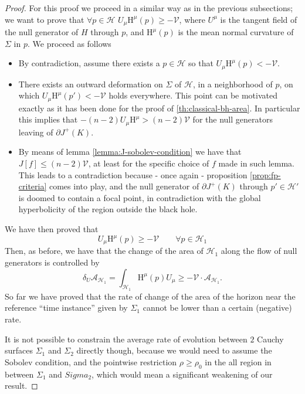 \begin{proof}
	For this proof we proceed in a similar way as in the previous subsections; we want to prove that \(\forall p \in \mathscr{H}\) \(U_{\mu}\mathrm{H}^{\mu}(p) \ge -\mathcal{V}\), where \(U^{\mu}\) is the tangent field of the null generator of \(H\) through \(p\), and \(\mathrm{H}^{\mu}(p)\) is the mean normal curvature of \(\Sigma\) in \(p\). We proceed as follows
	\begin{itemize}
		\item[\ding{99}] By contradiction, assume there exists a \(p\in \mathscr{H}\) so that \(U_{\mu}\mathrm{H}^{\mu}(p) < -\mathcal{V}\).
  		\item[\ding{99}] There exists an outward deformation on \(\Sigma\) of \(\mathscr{H}\), in a neighborhood of \(p\), on which \(U_{\mu}\mathrm{H}^{\mu}(p') < -\mathcal{V}\) holds everywhere. This point can be motivated exactly as it has been done for the proof of \ref{th:classical-bh-area}. In particular this implies that \(-(n -2) U_{\mu}\mathrm{H}^{\mu} > (n-2)\mathcal{V}\) for the null generators leaving of \(\partial J^+(K)\).
    	\item[\ding{99}] By means of lemma \ref{lemma:J-sobolev-condition} we have that \(J[f] \le (n - 2)\mathcal{V}\), at least for the specific choice of \(f\) made in such lemma. This leads to a contradiction because - once again - proposition \ref{prop:fp-criteria} comes into play, and the null generator of \(\partial J^+(K)\) through \(p'\in \mathscr{H}'\) is doomed to contain a focal point, in contradiction with the global hyperbolicity of the region outside the black hole.
	\end{itemize}
	We have then proved that 
	\[
		U_{\mu}\mathrm{H}^{\mu}(p) \ge -\mathcal{V}	\quad\quad \forall p \in \mathscr{H}_1
	\]
	Then, as before, we have that the change of the area of \(\mathscr{H}_1\) along the flow of null generators is controlled by
	\begin{equation*}
		\delta_U\mathcal{A}_{\mathscr{H}_1} = \int_{\mathscr{H}_1} \mathrm{H}^{\mu}(p)U_{\mu} \ge - \mathcal{V}\cdot\mathcal{A}_{\mathscr{H}_1}.
	\end{equation*}
	So far we have proved that the rate of change of the area of the horizon near the reference ``time instance'' given by \(\Sigma_1\) cannot be lower than a certain (negative) rate. 
	
	It is not possible to constrain the average rate of evolution between \(2\) Cauchy surfaces \(\Sigma_1\) and \(\Sigma_2\) directly though, because we would need to assume the Sobolev condition, and the pointwise restriction \(\rho \ge \rho_0\) in the all region in between \(\Sigma_1\) and \(Sigma_2\), which would mean a significant weakening of our result.

\end{proof}

